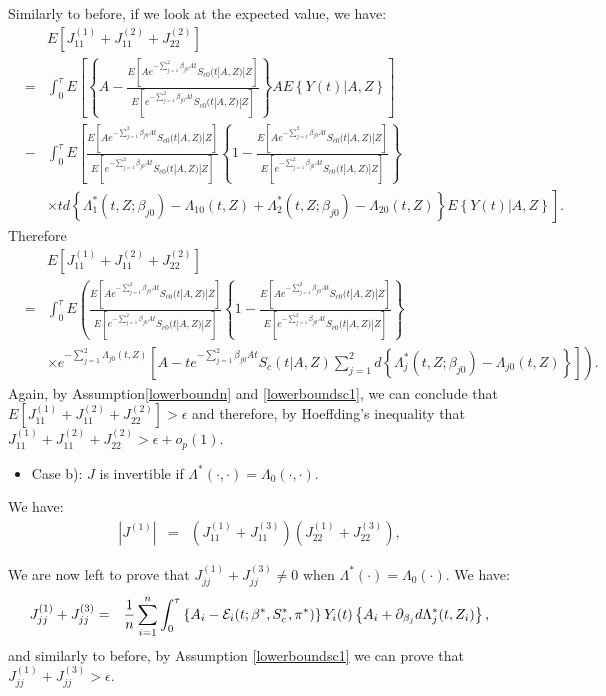 \documentclass[11pt]{article}
\newcommand{\eqnn}{\begin{eqnarray*}}
\newcommand{\een}{\end{eqnarray*}}
\begin{document}
Similarly to before, if we look at the expected value, we have:
\eqnn
&&E\left[J^{(1)}_{11}+J^{(2)}_{11}+J^{(2)}_{22}\right]\\&=&\int_0^\tau E \left[\left\{A-\frac{E\left[A e^{-\sum_{j=1}^2\beta_{j0}At}S_{c0}(t | A,Z) | Z \right]}{E\left[e^{-\sum_{j=1}^2\beta_{j0}At}S_{c0}(t | A,Z ) | Z\right]}\right\}AE\left\{ Y(t) | A, Z \right\}\right]\nonumber\\
&-&\int_0^\tau E\left[\frac{E\left[A e^{-\sum_{j=1}^2\beta_{j0}At}S_{c0}(t | A,Z) | Z \right]}{E\left[e^{-\sum_{j=1}^2\beta_{j0}At}S_{c0}(t | A,Z ) | Z\right]}\left\{1-\frac{E\left[A e^{-\sum_{j=1}^2\beta_{j0}At}S_{c0}(t | A,Z) | Z \right]}{E\left[e^{-\sum_{j=1}^2\beta_{j0}At}S_{c0}(t | A,Z ) | Z\right]}\right\}\right.\nonumber\\&&\times\left. td\left\{\Lambda_1^{*}(t,Z ; \beta_{j0})-\Lambda_{10}(t,Z)+\Lambda_2^{*}(t,Z; \beta_{j0})-\Lambda_{20}(t,Z)\right\}E\left\{ Y(t) | A, Z \right\}\right].\nonumber
\een
Therefore
\eqnn
&&E\left[J^{(1)}_{11}+J^{(2)}_{11}+J^{(2)}_{22}\right]\\
&=&\int_0^\tau E\left(\frac{E\left[A e^{-\sum_{j=1}^2\beta_{j0}At}S_{c0}(t | A,Z) | Z \right]}{E\left[e^{-\sum_{j=1}^2\beta_{j0}At}S_{c0}(t | A,Z ) | Z\right]}\left\{1-\frac{E\left[A e^{-\sum_{j=1}^2\beta_{j0}At}S_{c0}(t | A,Z) | Z \right]}{E\left[e^{-\sum_{j=1}^2\beta_{j0}At}S_{c0}(t | A,Z ) | Z\right]}\right\}\right.\nonumber\\&&\times \left.e^{-\sum_{j=1}^2\Lambda_{j0}(t,Z)}\left[A - te^{-\sum_{j=1}^2\beta_{j0}At}S_c(t | A,Z)\sum_{j=1}^2d\left\{\Lambda_j^{*}(t,Z ; \beta_{j0})-\Lambda_{j0}(t,Z)\right\}\right]\right).\nonumber
\een
Again, by Assumption\ref{lowerboundn} and \ref{lowerboundsc1}, we can conclude that $E\left[J^{(1)}_{11}+J^{(2)}_{11}+J^{(2)}_{22}\right]>\epsilon$ and therefore, by Hoeffding's inequality that $J^{(1)}_{11}+J^{(2)}_{11}+J^{(2)}_{22}>\epsilon+o_p(1)$.

\begin{itemize}
\item{Case b): $J$ is invertible if $\Lambda^{*}(\cdot,\cdot)=\Lambda_0(\cdot,\cdot)$.}
\end{itemize}  
We have:
\eqnn
|J^{(1)}|&=&(J^{(1)}_{11}+J^{(3)}_{11})(J^{(1)}_{22}+J^{(3)}_{22}),
\een

We are now left to prove that $J^{(1)}_{jj}+J^{(3)}_{jj}\neq 0$ when $\Lambda^{*}(\cdot)=\Lambda_0(\cdot)$.
We have:
\eqnn
J^{(1)}_{jj}+J^{(3)}_{jj}&=&\frac{1}{n}\sum_{i=1}^n\int_0^\tau  \left\{A_i-{\cal E}_i(t; {\beta}^{*}, S^{*}_c,\pi^{*})\right\}Y_i(t)\left\{A_i+\partial_{\beta_j}d\Lambda^{*}_j(t,Z_i)\right\},
\een
and similarly to before, by Assumption \ref{lowerboundsc1} we can prove that $J^{(1)}_{jj}+J^{(3)}_{jj}>\epsilon$.
\end{document}
